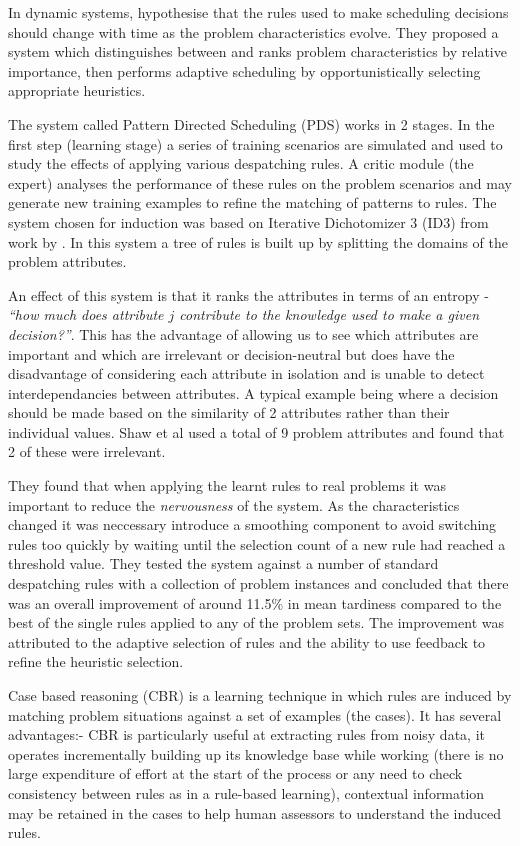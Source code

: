 In dynamic systems, \citet{shaw90intelligent} hypothesise that the rules used to make scheduling decisions should change with time as the problem characteristics evolve. They proposed a system which distinguishes between and ranks problem characteristics by relative importance, then performs adaptive scheduling by opportunistically selecting appropriate heuristics. 

The system called Pattern Directed Scheduling (PDS) works in 2 stages. In the first step (learning stage) a series of training scenarios are simulated and used to study the effects of applying various despatching rules. A critic module (the expert) analyses the performance of these rules on the problem scenarios and may generate new training examples to refine the matching of patterns to rules. The system chosen for induction was based on Iterative Dichotomizer 3 (ID3) from work by \citet{quinlan86induction}. In this system a tree of rules is built up by splitting the domains of the problem attributes.%

An effect of this system is that it ranks the attributes in terms of an entropy - \emph{``how much does attribute $j$ contribute to the knowledge used to make a given decision?''}. This has the advantage of allowing us to see which attributes are important and which are irrelevant or decision-neutral but does have the disadvantage of considering each attribute in isolation and is unable to detect interdependancies between attributes. A typical example being where a decision should be made based on the similarity of 2 attributes rather than their individual values. Shaw et al used a total of 9 problem attributes and found that 2 of these were irrelevant. 

They found that when applying the learnt rules to real problems it was important to reduce the \emph{nervousness} of the system. As the characteristics changed it was neccessary introduce a smoothing component to avoid switching rules too quickly by waiting until the selection count of a new rule had reached a threshold value. They tested the system against a number of standard despatching rules with a collection of problem instances and concluded that there was an overall improvement of around 11.5\% in mean tardiness compared to the best of the single rules applied to any of the problem sets. The improvement was attributed to the adaptive selection of rules and the ability to use feedback to refine the heuristic selection.


Case based reasoning (CBR) is a learning technique in which rules are induced by matching problem situations against a set of examples (the cases). It has several advantages:- CBR is particularly useful at extracting rules from noisy data, it operates incrementally building up its knowledge base while working (there is no large expenditure of effort at the start of the process or any need to check consistency between rules as in a rule-based learning), contextual information may be retained in the cases to help human assessors to understand the induced rules.

